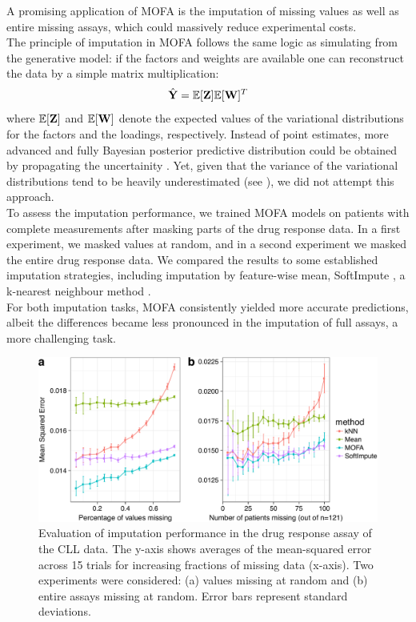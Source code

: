 A promising application of MOFA is the imputation of missing values as well as entire missing assays, which could massively reduce experimental costs.\\
The principle of imputation in MOFA follows the same logic as simulating from the generative model: if the factors and weights are available one can reconstruct the data by a simple matrix multiplication:
\[
	\hat{{\bf Y}} = \mathbb{E}[{\bf Z}] \mathbb{E}[{\bf W}]^T
\]
where $\mathbb{E}[{\bf Z}]$ and $\mathbb{E}[{\bf W}]$ denote the expected values of the variational distributions for the factors and the loadings, respectively. Instead of point estimates, more advanced and fully Bayesian posterior predictive distribution could be obtained by propagating the uncertainity \cite{Gelman2013}. Yet, given that the variance of the variational distributions tend to be heavily underestimated (see ), we did not attempt this approach.\\

To assess the imputation performance, we trained MOFA models on patients with complete measurements after masking parts of the drug response data. In a first experiment, we masked values at random, and in a second experiment we masked the entire drug response data. 
We compared the results to some established imputation strategies, including imputation by feature-wise mean, SoftImpute \cite{Mazumder2010}, a k-nearest neighbour method \cite{Troyanskaya2001}.\\

For both imputation tasks, MOFA consistently yielded more accurate predictions, albeit the differences became less pronounced in the imputation of full assays, a more challenging task.

\begin{figure}[H]
	\centering 	
	\includegraphics[width=1.0\textwidth]{MOFA_imputation}
	\caption{Evaluation of imputation performance in the drug response assay of the CLL data. The y-axis shows averages of the mean-squared error across 15 trials for increasing fractions of missing data (x-axis). Two experiments were considered: (a) values missing at random and (b) entire assays missing at random. Error bars represent standard deviations.}
	\label{fig:MOFA_imputation}
\end{figure}


